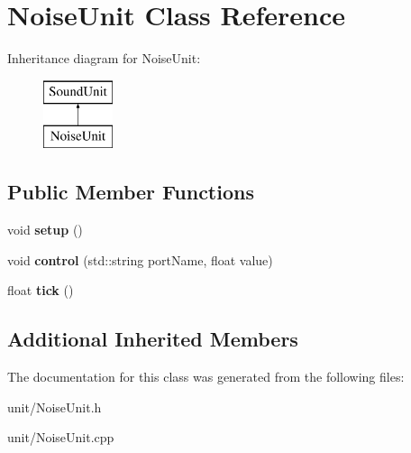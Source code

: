\hypertarget{classNoiseUnit}{}\section{Noise\+Unit Class Reference}
\label{classNoiseUnit}
Inheritance diagram for Noise\+Unit\+:\begin{figure}[H]
\begin{center}
\leavevmode
\includegraphics[height=2.000000cm]{classNoiseUnit}
\end{center}
\end{figure}
\subsection*{Public Member Functions}
\begin{DoxyCompactItemize}
\item 
void {\bfseries setup} ()\hypertarget{classNoiseUnit_a81666e8bdea833fad6a4451a765c6b83}{}\label{classNoiseUnit_a81666e8bdea833fad6a4451a765c6b83}

\item 
void {\bfseries control} (std\+::string port\+Name, float value)\hypertarget{classNoiseUnit_a7014ea85fb499bbe69fcf7ce96be8d32}{}\label{classNoiseUnit_a7014ea85fb499bbe69fcf7ce96be8d32}

\item 
float {\bfseries tick} ()\hypertarget{classNoiseUnit_af48a9a915f7f593105e8fe2d2ddb745a}{}\label{classNoiseUnit_af48a9a915f7f593105e8fe2d2ddb745a}

\end{DoxyCompactItemize}
\subsection*{Additional Inherited Members}


The documentation for this class was generated from the following files\+:\begin{DoxyCompactItemize}
\item 
unit/Noise\+Unit.\+h\item 
unit/Noise\+Unit.\+cpp\end{DoxyCompactItemize}

